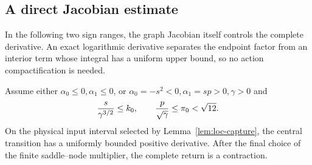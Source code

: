 \subsection{A direct Jacobian estimate}
\label{subsec:deg-raw-jacobian}

In the following two sign ranges, the graph Jacobian itself controls the
complete derivative. An exact logarithmic derivative separates the
endpoint factor from an interior term whose integral has a uniform upper
bound, so no action compactification is needed.

\begin{lemma}\label{deg:lem-raw-jacobian}
Assume either
\(\alpha _0\le0,\alpha _1\le0\), or
\(\alpha _0=-s^2<0,\alpha _1=sp>0,\gamma>0\) and
\[
 {s\over\gamma^{3/2}}\le k_0,\qquad
 {p\over\sqrt\gamma}\le\pi_0<\sqrt {12}.
\]
On the physical input interval selected by Lemma~\ref{lem:loc-capture},
the central transition has a uniformly bounded positive derivative.
After the final choice of the finite saddle--node multiplier, the
complete return is a contraction.
\end{lemma}

